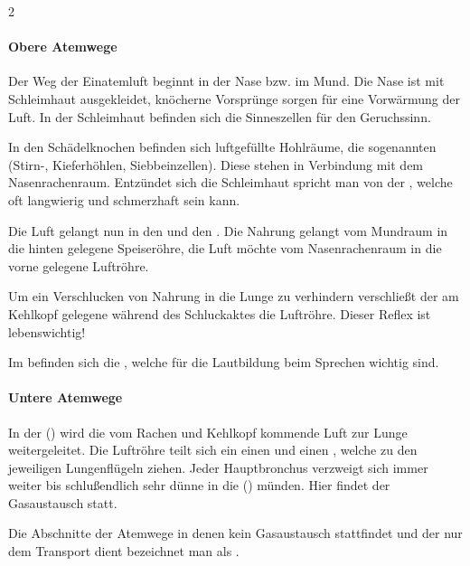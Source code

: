 \begin{multicols}{2}
\paragraph{Obere Atemwege}

Der Weg der Einatemluft beginnt in der Nase bzw. im Mund. Die Nase ist
mit Schleimhaut ausgekleidet, kn\"ocherne Vorspr\"unge sorgen f\"ur
eine Vorw\"armung der Luft. In der Schleimhaut be\-finden sich die
Sinneszellen f\"ur den Geruchssinn. 

In den Sch\"adelknochen befinden sich luft\-ge\-f\"ullte Hohlr\"aume,
die so\-genannten  (Stirn-,
Kiefer\-h\"ohlen, Siebbeinzellen). Diese stehen in Verbindung mit dem Nasenrachenraum.
Entz\"undet sich die Schleimhaut spricht man von der
, welche oft langwierig
und schmerzhaft sein kann. 

Die Luft gelangt nun in den  und den
.  Die Nahrung gelangt vom Mundraum in die
hinten gelegene Speiser\"ohre, die Luft m\"ochte vom Nasen\-rachen\-raum in die vorne gelegene Luftr\"ohre. 

Um ein Verschlucken von Nahrung in die Lunge zu verhindern
verschlie{\ss}t der am Kehlkopf gelegene 
w\"ahrend des Schluckaktes die Luftr\"ohre. Dieser Reflex ist lebenswichtig! 

Im   befinden sich die ,
welche f\"ur die Lautbildung beim Sprechen wichtig sind.

\paragraph{Untere Atemwege}

In der  () wird die vom Rachen
und Kehlkopf kommende Luft zur Lunge weitergeleitet. Die Luftr\"ohre teilt sich ein einen
 und einen  ,
welche zu den jeweiligen Lungenfl\"ugeln ziehen. Jeder Hauptbronchus verzweigt sich immer weiter
bis schlu{\ss}endlich sehr d\"unne  in die
 () m\"unden. Hier findet
der Gasaustausch statt.

Die Abschnitte der Atemwege in denen kein Gasaustausch stattfindet und
der nur dem Transport dient bezeichnet man als
{\quotedblbase}.

\end{multicols}


